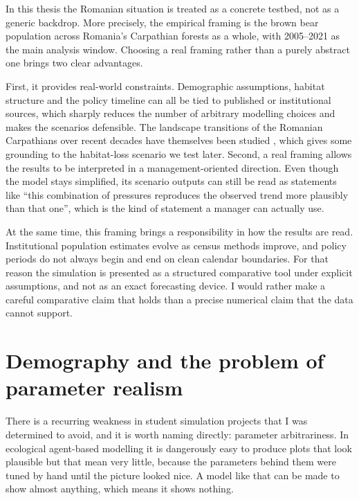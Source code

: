 In this thesis the Romanian situation is treated as a concrete testbed, not as a generic backdrop. More precisely, the empirical framing is the brown bear population across Romania's Carpathian forests as a whole, with 2005--2021 as the main analysis window. Choosing a real framing rather than a purely abstract one brings two clear advantages.

First, it provides real-world constraints. Demographic assumptions, habitat structure and the policy timeline can all be tied to published or institutional sources, which sharply reduces the number of arbitrary modelling choices and makes the scenarios defensible. The landscape transitions of the Romanian Carpathians over recent decades have themselves been studied \cite{Munteanu2014,Griffiths2013}, which gives some grounding to the habitat-loss scenario we test later. Second, a real framing allows the results to be interpreted in a management-oriented direction. Even though the model stays simplified, its scenario outputs can still be read as statements like ``this combination of pressures reproduces the observed trend more plausibly than that one'', which is the kind of statement a manager can actually use.

At the same time, this framing brings a responsibility in how the results are read. Institutional population estimates evolve as census methods improve, and policy periods do not always begin and end on clean calendar boundaries. For that reason the simulation is presented as a structured comparative tool under explicit assumptions, and not as an exact forecasting device. I would rather make a careful comparative claim that holds than a precise numerical claim that the data cannot support.

\section{Demography and the problem of parameter realism}

There is a recurring weakness in student simulation projects that I was determined to avoid, and it is worth naming directly: parameter arbitrariness. In ecological agent-based modelling it is dangerously easy to produce plots that look plausible but that mean very little, because the parameters behind them were tuned by hand until the picture looked nice. A model like that can be made to show almost anything, which means it shows nothing.

